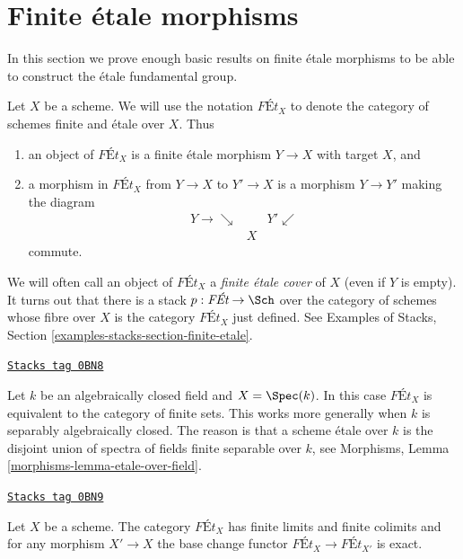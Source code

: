 \section{Finite \'etale morphisms}
\label{pione-section-finite-etale}
In this section we prove enough basic results on finite \'etale
morphisms to be able to construct the \'etale fundamental group.

\medskip\noindent
Let $X$ be a scheme. We will use the notation $\textit{F\'Et}_X$
to denote the category of schemes finite and \'etale over $X$.
Thus
\begin{enumerate}
\item an object of $\textit{F\'Et}_X$ is a finite \'etale morphism
$Y \to X$ with target $X$, and
\item a morphism in $\textit{F\'Et}_X$
from $Y \to X$ to $Y' \to X$ is a morphism $Y \to Y'$ making
the diagram
$$
\begin{array}{ccc}Y \longrightarrow\searrow &  & Y' \swarrow \\  & X & \end{array}
$$
commute.
\end{enumerate}
We will often call an object of $\textit{F\'Et}_X$ a
{\it finite \'etale cover} of $X$ (even if $Y$ is empty).
It turns out that there is a stack $p : \textit{F\'Et} \to \Sch$
over the category of schemes whose fibre over $X$ is the category
$\textit{F\'Et}_X$ just defined. See Examples of Stacks, Section
\ref{examples-stacks-section-finite-etale}.

\begin{example}
\label{pione-example-finite-etale-geometric-point}
\href{https://stacks.math.columbia.edu/tag/0BN8}{\texttt{Stacks tag 0BN8}}

Let $k$ be an algebraically closed field and $X = \Spec(k)$. In this case
$\textit{F\'Et}_X$ is equivalent to the category of finite sets. This works
more generally when $k$ is separably algebraically closed. The reason is
that a scheme \'etale over $k$ is the disjoint union of spectra of
fields finite separable over $k$, see
Morphisms, Lemma \ref{morphisms-lemma-etale-over-field}.
\end{example}

\begin{lemma}
\label{pione-lemma-finite-etale-covers-limits-colimits}
\href{https://stacks.math.columbia.edu/tag/0BN9}{\texttt{Stacks tag 0BN9}}

Let $X$ be a scheme. The category $\textit{F\'Et}_X$ has finite limits and
finite colimits and for any morphism $X' \to X$ the base change functor
$\textit{F\'Et}_X \to \textit{F\'Et}_{X'}$ is exact.
\end{lemma}

